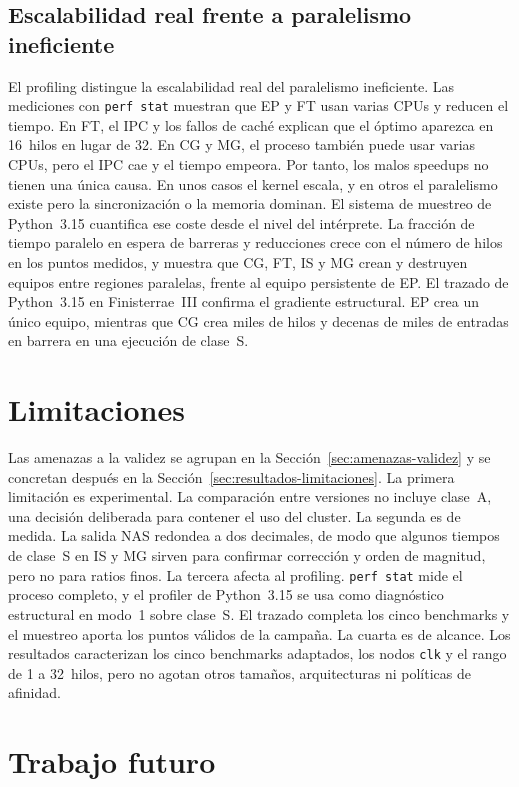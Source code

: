 \subsection{Escalabilidad real frente a paralelismo ineficiente}
El profiling distingue la escalabilidad real del paralelismo ineficiente. Las
mediciones con \texttt{perf stat} muestran que EP y FT usan varias CPUs y
reducen el tiempo. En FT, el IPC y los fallos de caché explican que el óptimo
aparezca en 16~hilos en lugar de 32. En CG y MG, el proceso también puede usar
varias CPUs, pero el IPC cae y el tiempo empeora. Por tanto, los malos speedups
no tienen una única causa. En unos casos el kernel escala, y en otros el
paralelismo existe pero la sincronización o la memoria dominan. El sistema de
muestreo de Python~3.15 cuantifica ese coste desde el nivel del intérprete. La
fracción de tiempo paralelo en espera de barreras y reducciones crece con el
número de hilos en los puntos medidos, y muestra que CG, FT, IS y MG crean y
destruyen equipos entre regiones paralelas, frente al equipo persistente de EP.
El trazado de Python~3.15 en Finisterrae~III confirma el gradiente estructural.
EP crea un único equipo, mientras que CG crea miles de hilos y decenas de miles
de entradas en barrera en una ejecución de clase~S.


\section{Limitaciones}
\label{sec:limitaciones}

Las amenazas a la validez se agrupan en la
Sección~\ref{sec:amenazas-validez} y se concretan después en la
Sección~\ref{sec:resultados-limitaciones}.
La primera limitación es experimental. La comparación entre versiones no incluye
clase~A, una decisión deliberada para contener el uso del cluster. La segunda es
de medida. La salida NAS redondea a dos decimales, de modo que algunos tiempos de
clase~S en IS y MG sirven para confirmar corrección y orden de magnitud, pero no
para ratios finos. La tercera afecta al profiling. \texttt{perf stat} mide el
proceso completo, y el profiler de Python~3.15 se usa como diagnóstico
estructural en modo~1 sobre clase~S. El trazado completa los cinco benchmarks y
el muestreo aporta los puntos válidos de la campaña. La cuarta es de alcance.
Los resultados caracterizan los cinco benchmarks adaptados, los nodos
\texttt{clk} y el rango de 1 a 32~hilos, pero no agotan otros tamaños,
arquitecturas ni políticas de afinidad.


\section{Trabajo futuro}
\label{sec:trabajo-futuro}

